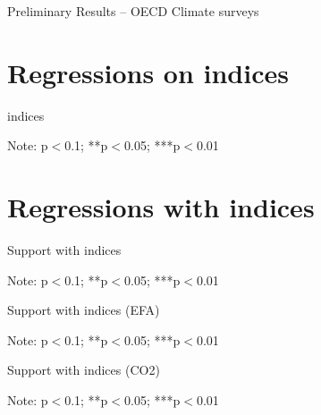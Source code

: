 \documentclass{article}
\begin{document}
\begin{LARGE}
	\begin{center}
		Preliminary Results – OECD Climate surveys	
	\end{center}
	
\end{LARGE}
	\tableofcontents
	\listoftables

\clearpage

\section{Regressions on indices}


\begin{table}[h!]
	\caption{indices}
	\begin{center}
		\scalebox{0.7}{}
	\end{center}
	{\footnotesize Note: 
	\newline *p$<$0.1; **p$<$0.05; ***p$<$0.01}
\end{table}	

\section{Regressions with indices}

\begin{table}[h!]
	\caption{Support with indices}
	\begin{center}
		\scalebox{0.7}{}
	\end{center}
	{\footnotesize Note: 
	\newline *p$<$0.1; **p$<$0.05; ***p$<$0.01}
\end{table}	

\begin{table}[h!]
	\caption{Support with indices (EFA)}
	\begin{center}
		\scalebox{0.7}{}
	\end{center}
	{\footnotesize Note: 
	\newline *p$<$0.1; **p$<$0.05; ***p$<$0.01}
\end{table}	

\begin{table}[h!]
	\caption{Support with indices (CO2)}
	\begin{center}
		\scalebox{0.7}{}
	\end{center}
	{\footnotesize Note: 
	\newline *p$<$0.1; **p$<$0.05; ***p$<$0.01}
\end{table}	
\end{document}
